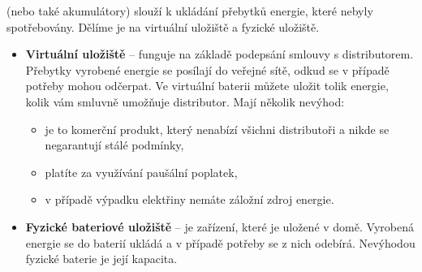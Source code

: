 (nebo také akumulátory) slouží k ukládání přebytků energie, které nebyly spotřebovány.
Dělíme je na virtuální uložiště a fyzické uložiště.

\begin{itemize}
    \item \textbf{Virtuální uložiště} -- funguje na základě podepsání smlouvy s distributorem. Přebytky vyrobené energie se posílají do veřejné sítě, odkud se v případě potřeby mohou odčerpat.  Ve virtuální baterii můžete uložit tolik energie, kolik vám smluvně umožňuje distributor. Mají několik nevýhod:
    \begin{itemize}
        \item je to komerční produkt, který nenabízí všichni distributoři a nikde se negarantují stálé podmínky,
        \item platíte za využívání paušální poplatek,
        \item v případě výpadku elektřiny nemáte záložní zdroj energie.
    \end{itemize}
    \item \textbf{Fyzické bateriové uložiště} -- je zařízení, které je uložené v domě. Vyrobená energie se do baterií ukládá a v případě potřeby se z nich odebírá. Nevýhodou fyzické baterie je její kapacita.
\end{itemize}






